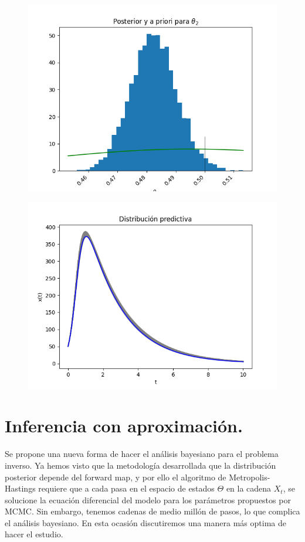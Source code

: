 \begin{figure}[H] 
    \centering 
    \includegraphics[width = 10 cm ]{img/Exp_Central_SIR_sigma/Figuras/Generales/Post_theta2_SIR_sigma.png} 
\end{figure} 


\begin{figure}[H] 
    \centering 
    \includegraphics[width = 10 cm ]{img/Exp_Central_SIR_sigma/Figuras/Generales/Predictiva_SIR_sigma.png} 
\end{figure} 




\section{Inferencia con aproximación.}

Se propone una nueva forma de hacer el análisis bayesiano para el problema inverso. Ya hemos visto que la metodología desarrollada que la distribución posterior depende del forward map, y por ello el algoritmo de Metropolis-Hastings requiere que a cada pasa en el espacio de estados $\Theta$ en la cadena $X_t$, se solucione la ecuación diferencial del modelo para los parámetros propuestos por MCMC. Sin embargo, tenemos cadenas de medio millón de pasos, lo que complica el análisis bayesiano. En esta ocasión discutiremos una manera más optima de hacer el estudio.

